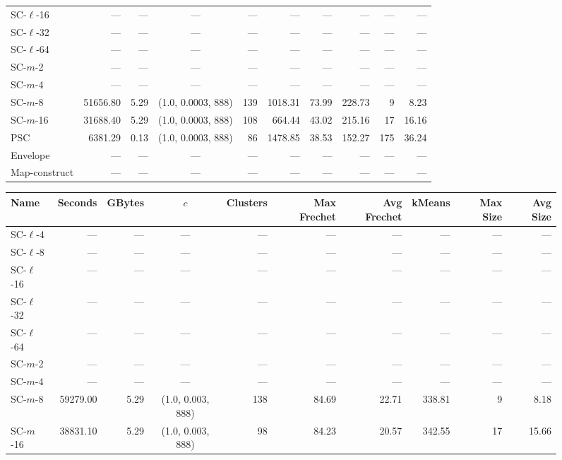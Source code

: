 \documentclass[11pt]{article}
\begin{document}
\begin{figure}
\begin{center}
\begin{minipage}{\textwidth}
{\begin{tabular}{@{}lrrcrrrrrr@{}}
        SC-$\ell$-16 & --- & --- & --- & --- & --- & --- & --- & --- & ---\\
        SC-$\ell$-32 & --- & --- & --- & --- & --- & --- & --- & --- & ---\\
        SC-$\ell$-64 & --- & --- & --- & --- & --- & --- & --- & --- & ---\\
        SC-$m$-2 & --- & --- & --- & --- & --- & --- & --- & --- & ---\\
        SC-$m$-4 & --- & --- & --- & --- & --- & --- & --- & --- & ---\\
        SC-$m$-8 & 51656.80 & 5.29 & (1.0, 0.0003, 888) & 139 & 1018.31 & 73.99 & 228.73 & 9 & 8.23\\
        SC-$m$-16 & 31688.40 & 5.29 & (1.0, 0.0003, 888) & 108 & 664.44 & 43.02 & 215.16 & 17 & 16.16\\
        PSC & 6381.29 & 0.13 & (1.0, 0.0003, 888) & 86 & 1478.85 & 38.53 & 152.27 & 175 & 36.24\\
        Envelope & --- & --- & --- & --- & --- & --- & --- & --- & ---\\
        Map-construct & --- & --- & --- & --- & --- & --- & --- & --- & ---\\
        \bottomrule
    \end{tabular}
    }
    {
    \begin{tabular}{@{}lrrcrrrrrr@{}}
        \toprule
        Name & Seconds & GBytes & $c$ & Clusters & Max Frechet & Avg Frechet & kMeans & Max Size & Avg Size\\
        \midrule
        SC-$\ell$-4 & --- & --- & --- & --- & --- & --- & --- & --- & ---\\
        SC-$\ell$-8 & --- & --- & --- & --- & --- & --- & --- & --- & ---\\
        SC-$\ell$-16 & --- & --- & --- & --- & --- & --- & --- & --- & ---\\
        SC-$\ell$-32 & --- & --- & --- & --- & --- & --- & --- & --- & ---\\
        SC-$\ell$-64 & --- & --- & --- & --- & --- & --- & --- & --- & ---\\
        SC-$m$-2 & --- & --- & --- & --- & --- & --- & --- & --- & ---\\
        SC-$m$-4 & --- & --- & --- & --- & --- & --- & --- & --- & ---\\
        SC-$m$-8 & 59279.00 & 5.29 & (1.0, 0.003, 888) & 138 & 84.69 & 22.71 & 338.81 & 9 & 8.18\\
        SC-$m$-16 & 38831.10 & 5.29 & (1.0, 0.003, 888) & 98 & 84.23 & 20.57 & 342.55 & 17 & 15.66\\

\end{tabular}}
\end{minipage}
\end{center}
\end{figure}
\end{document}
